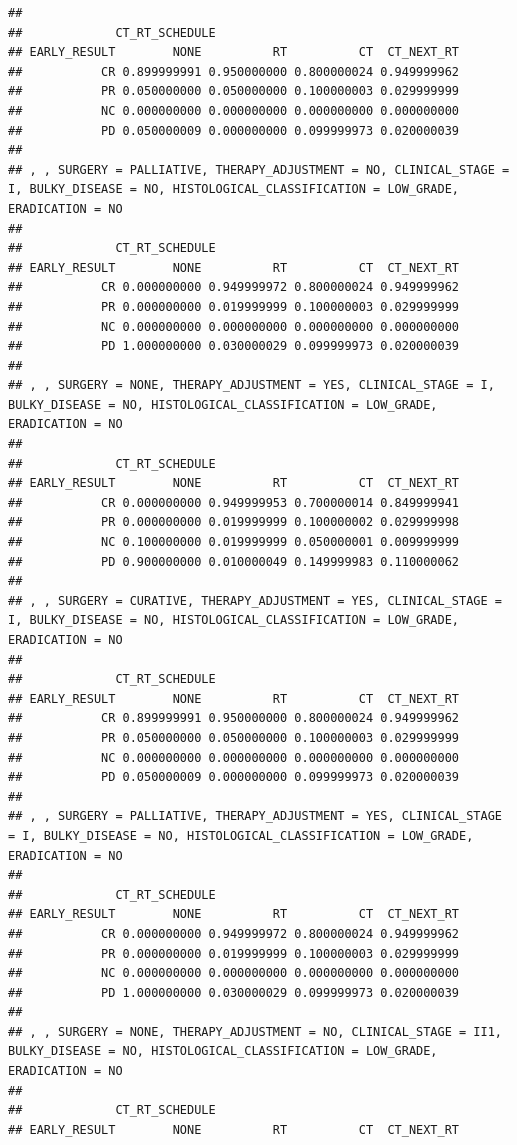 \documentclass[]{article}
\begin{document}
\begin{verbatim}
## 
##             CT_RT_SCHEDULE
## EARLY_RESULT        NONE          RT          CT  CT_NEXT_RT
##           CR 0.899999991 0.950000000 0.800000024 0.949999962
##           PR 0.050000000 0.050000000 0.100000003 0.029999999
##           NC 0.000000000 0.000000000 0.000000000 0.000000000
##           PD 0.050000009 0.000000000 0.099999973 0.020000039
## 
## , , SURGERY = PALLIATIVE, THERAPY_ADJUSTMENT = NO, CLINICAL_STAGE = I, BULKY_DISEASE = NO, HISTOLOGICAL_CLASSIFICATION = LOW_GRADE, ERADICATION = NO
## 
##             CT_RT_SCHEDULE
## EARLY_RESULT        NONE          RT          CT  CT_NEXT_RT
##           CR 0.000000000 0.949999972 0.800000024 0.949999962
##           PR 0.000000000 0.019999999 0.100000003 0.029999999
##           NC 0.000000000 0.000000000 0.000000000 0.000000000
##           PD 1.000000000 0.030000029 0.099999973 0.020000039
## 
## , , SURGERY = NONE, THERAPY_ADJUSTMENT = YES, CLINICAL_STAGE = I, BULKY_DISEASE = NO, HISTOLOGICAL_CLASSIFICATION = LOW_GRADE, ERADICATION = NO
## 
##             CT_RT_SCHEDULE
## EARLY_RESULT        NONE          RT          CT  CT_NEXT_RT
##           CR 0.000000000 0.949999953 0.700000014 0.849999941
##           PR 0.000000000 0.019999999 0.100000002 0.029999998
##           NC 0.100000000 0.019999999 0.050000001 0.009999999
##           PD 0.900000000 0.010000049 0.149999983 0.110000062
## 
## , , SURGERY = CURATIVE, THERAPY_ADJUSTMENT = YES, CLINICAL_STAGE = I, BULKY_DISEASE = NO, HISTOLOGICAL_CLASSIFICATION = LOW_GRADE, ERADICATION = NO
## 
##             CT_RT_SCHEDULE
## EARLY_RESULT        NONE          RT          CT  CT_NEXT_RT
##           CR 0.899999991 0.950000000 0.800000024 0.949999962
##           PR 0.050000000 0.050000000 0.100000003 0.029999999
##           NC 0.000000000 0.000000000 0.000000000 0.000000000
##           PD 0.050000009 0.000000000 0.099999973 0.020000039
## 
## , , SURGERY = PALLIATIVE, THERAPY_ADJUSTMENT = YES, CLINICAL_STAGE = I, BULKY_DISEASE = NO, HISTOLOGICAL_CLASSIFICATION = LOW_GRADE, ERADICATION = NO
## 
##             CT_RT_SCHEDULE
## EARLY_RESULT        NONE          RT          CT  CT_NEXT_RT
##           CR 0.000000000 0.949999972 0.800000024 0.949999962
##           PR 0.000000000 0.019999999 0.100000003 0.029999999
##           NC 0.000000000 0.000000000 0.000000000 0.000000000
##           PD 1.000000000 0.030000029 0.099999973 0.020000039
## 
## , , SURGERY = NONE, THERAPY_ADJUSTMENT = NO, CLINICAL_STAGE = II1, BULKY_DISEASE = NO, HISTOLOGICAL_CLASSIFICATION = LOW_GRADE, ERADICATION = NO
## 
##             CT_RT_SCHEDULE
## EARLY_RESULT        NONE          RT          CT  CT_NEXT_RT

\end{verbatim}
\end{document}
